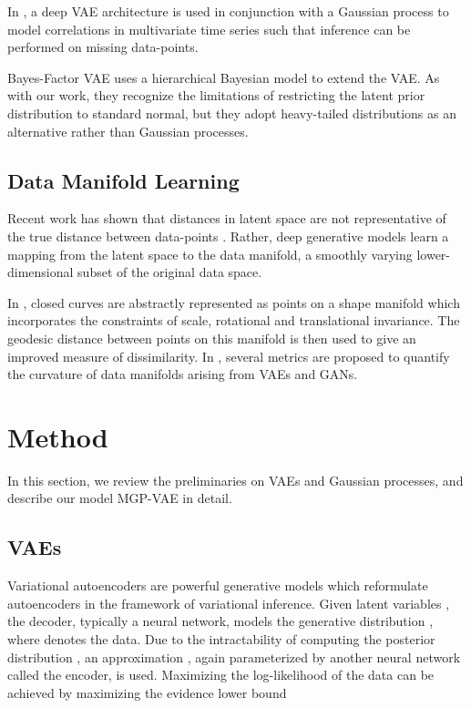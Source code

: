 \documentclass[runningheads]{llncs}
\begin{document}
   In \cite{Fortuin2019MultivariateTS}, a deep VAE architecture is used in conjunction with a Gaussian process to model correlations in multivariate time series such that inference can be performed on missing data-points. \par 
   
   Bayes-Factor VAE \cite{Kim2019BayesFactorVAEHB} uses a hierarchical Bayesian model to extend the VAE. As with our work, they recognize the limitations of restricting the latent prior distribution to standard normal, but they adopt heavy-tailed distributions as an alternative rather than Gaussian processes.

   \subsection{Data Manifold Learning}
   Recent work has shown that distances in latent space are not representative of the true distance between data-points \cite{Arvanitidis2017LatentSO,Khnel2018LatentSN,Shao2017TheRG}. Rather, deep generative models learn a mapping from the latent space to the data manifold, a smoothly varying lower-dimensional subset of the original data space. \par 

   In \cite{shapeAnalysis}, closed curves are abstractly represented as points on a shape manifold which incorporates the constraints of scale, rotational and translational invariance. The geodesic distance between points on this manifold is then used to give an improved measure of dissimilarity.   In \cite{Shukla2019GeometryOD}, several metrics are proposed to quantify the curvature of data manifolds arising from VAEs and GANs. 


   \section{Method}
   In this section, we review the preliminaries on VAEs and Gaussian processes, and describe our model MGP-VAE in detail.

   \subsection{VAEs}
   
   Variational autoencoders \cite{Kingma2013AutoEncodingVB} are powerful generative models which reformulate autoencoders in the framework of variational inference. Given latent variables , the decoder, typically a neural network, models the generative distribution , where  denotes the data. Due to the intractability of computing the posterior distribution , an approximation , again parameterized by another neural network called the encoder, is used. Maximizing the log-likelihood of the data can be achieved by maximizing the evidence lower bound
   
\end{document}
